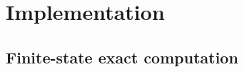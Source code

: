 \clearpage
\section{Implementation}
\label{sec:implementation}


\ifleanlinks
{}\par
\fi
\clearpage

\subsection{Finite-state exact computation}
